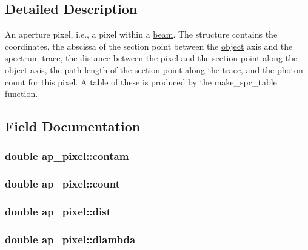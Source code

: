 \subsection{Detailed Description}
An aperture pixel, i.e., a pixel within a \hyperlink{structbeam}{beam}. The structure contains the coordinates, the abscissa of the section point between the \hyperlink{structobject}{object} axis and the \hyperlink{structspectrum}{spectrum} trace, the distance between the pixel and the section point along the \hyperlink{structobject}{object} axis, the path length of the section point along the trace, and the photon count for this pixel. A table of these is produced by the make\_\-spc\_\-table function. 

\subsection{Field Documentation}
\hypertarget{structap__pixel_a2191ef670b1b5c515fda841dda181f62}{
\subsubsection[{contam}]{\setlength{\rightskip}{0pt plus 5cm}double {\bf ap\_\-pixel::contam}}}
\label{structap__pixel_a2191ef670b1b5c515fda841dda181f62}
\hypertarget{structap__pixel_a846018a7e3b143259419bd74e2d9073f}{
\subsubsection[{count}]{\setlength{\rightskip}{0pt plus 5cm}double {\bf ap\_\-pixel::count}}}
\label{structap__pixel_a846018a7e3b143259419bd74e2d9073f}
\hypertarget{structap__pixel_abd0f197da151fac01c9e4cbd4146f212}{
\subsubsection[{dist}]{\setlength{\rightskip}{0pt plus 5cm}double {\bf ap\_\-pixel::dist}}}
\label{structap__pixel_abd0f197da151fac01c9e4cbd4146f212}
\hypertarget{structap__pixel_a8c1c7b5a35a04145fccfc3f84c420cde}{
\subsubsection[{dlambda}]{\setlength{\rightskip}{0pt plus 5cm}double {\bf ap\_\-pixel::dlambda}}}
